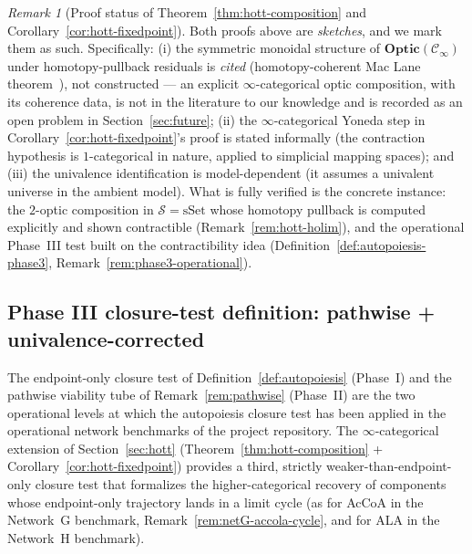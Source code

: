 \documentclass[11pt,a4paper]{article}
\theoremstyle{plain}
\theoremstyle{definition}
\theoremstyle{remark}
\newtheorem{remark}[theorem]{Remark}
\newcommand{\Optic}{\mathbf{Optic}}
\begin{document}
\begin{remark}[Proof status of Theorem~\ref{thm:hott-composition} and
Corollary~\ref{cor:hott-fixedpoint}]
\label{rem:proof-status-hott}
Both proofs above are \emph{sketches}, and we mark them as such.
Specifically: (i) the symmetric monoidal structure of
$\Optic(\mathcal{C}_\infty)$ under homotopy-pullback residuals is
\emph{cited} (homotopy-coherent Mac Lane
theorem~\cite[Thm.~2.4.3]{lurie2017ha}), not constructed
--- an explicit $\infty$-categorical optic composition, with its
coherence data, is not in the literature to our knowledge and is
recorded as an open problem in Section~\ref{sec:future};
(ii) the $\infty$-categorical Yoneda step in
Corollary~\ref{cor:hott-fixedpoint}'s proof is stated informally
(the contraction hypothesis is $1$-categorical in nature, applied to
simplicial mapping spaces); and (iii) the univalence identification
is model-dependent (it assumes a univalent universe in the ambient
model). What is fully verified is the concrete instance: the
$2$-optic composition in $\mathcal{S}=\mathrm{sSet}$ whose homotopy
pullback is computed explicitly and shown contractible
(Remark~\ref{rem:hott-holim}), and the operational Phase~III test
built on the contractibility idea
(Definition~\ref{def:autopoiesis-phase3},
Remark~\ref{rem:phase3-operational}).
\end{remark}

\subsection{Phase III closure-test definition: pathwise + univalence-corrected}
\label{sec:phase3}

The endpoint-only closure test of Definition~\ref{def:autopoiesis} (Phase~I)
and the pathwise viability tube of Remark~\ref{rem:pathwise} (Phase~II) are
the two operational levels at which the autopoiesis closure test has been
applied in the operational network benchmarks of the project repository.
The $\infty$-categorical extension of Section~\ref{sec:hott} (Theorem~\ref{thm:hott-composition}
+ Corollary~\ref{cor:hott-fixedpoint}) provides a third, strictly
weaker-than-endpoint-only closure test that formalizes the higher-categorical
recovery of components whose endpoint-only trajectory lands in a limit
cycle (as for AcCoA in the Network~G benchmark, Remark~\ref{rem:netG-accola-cycle}, and
for ALA in the Network~H benchmark).
\end{document}
